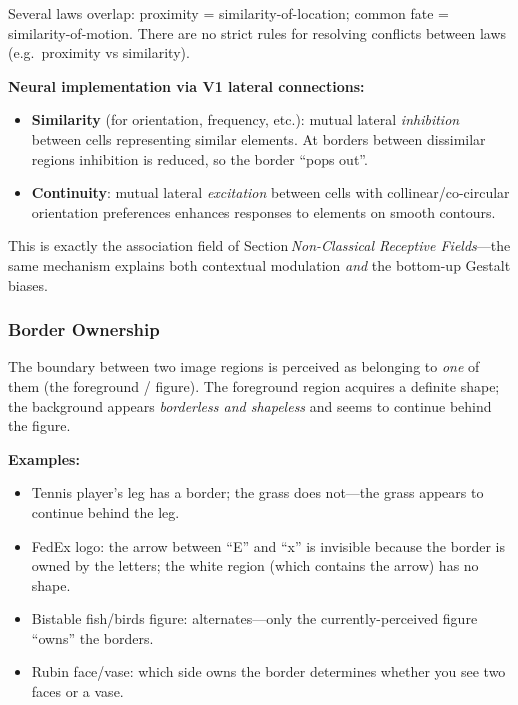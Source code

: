 \begin{tipbox}
Several laws overlap: proximity = similarity-of-location; common fate = similarity-of-motion. There are no strict rules for resolving conflicts between laws (e.g.\ proximity vs similarity).
\end{tipbox}

\separator

\textbf{Neural implementation via V1 lateral connections:}

\begin{itemize}
  \item \textbf{Similarity} (for orientation, frequency, etc.): mutual lateral \emph{inhibition} between cells representing similar elements. At borders between dissimilar regions inhibition is reduced, so the border ``pops out''.
  \item \textbf{Continuity}: mutual lateral \emph{excitation} between cells with collinear/co-circular orientation preferences enhances responses to elements on smooth contours.
\end{itemize}

This is exactly the association field of Section\,\textit{Non-Classical Receptive Fields}---the same mechanism explains both contextual modulation \emph{and} the bottom-up Gestalt biases.

\bigseparator

\subsubsection{Border Ownership}

\begin{defbox}
The boundary between two image regions is perceived as belonging to \emph{one} of them (the foreground / figure). The foreground region acquires a definite shape; the background appears \emph{borderless and shapeless} and seems to continue behind the figure.
\end{defbox}

\textbf{Examples:}
\begin{itemize}
  \item Tennis player's leg has a border; the grass does not---the grass appears to continue behind the leg.
  \item FedEx logo: the arrow between ``E'' and ``x'' is invisible because the border is owned by the letters; the white region (which contains the arrow) has no shape.
  \item Bistable fish/birds figure: alternates---only the currently-perceived figure ``owns'' the borders.
  \item Rubin face/vase: which side owns the border determines whether you see two faces or a vase.
\end{itemize}


